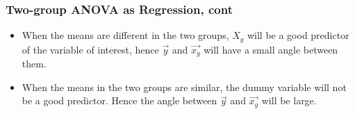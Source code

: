 \documentclass{beamer}
\begin{document}
\begin{frame}
  \frametitle{Two-group ANOVA as Regression, cont}

\begin{itemize}

\item When the means are different in the two groups, $X_g$ will be a good predictor of the variable of interest, hence $\vec{y}$ and $\vec{x_g}$ will have a small angle between them.

\item When the means in the two groups are similar, the dummy variable will not be a good predictor.  Hence the angle between $\vec{y}$ and $\vec{x_g}$ will be large.

\end{itemize}

\begin{center}


\end{center}

\end{frame}
\end{document}
